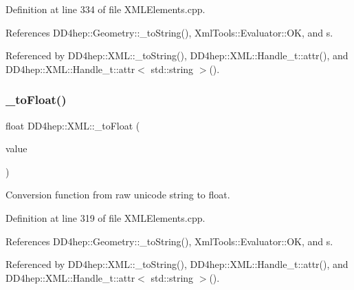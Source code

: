 Definition at line 334 of file X\+M\+L\+Elements.\+cpp.



References D\+D4hep\+::\+Geometry\+::\+\_\+to\+String(), Xml\+Tools\+::\+Evaluator\+::\+OK, and s.



Referenced by D\+D4hep\+::\+X\+M\+L\+::\+\_\+to\+String(), D\+D4hep\+::\+X\+M\+L\+::\+Handle\+\_\+t\+::attr(), and D\+D4hep\+::\+X\+M\+L\+::\+Handle\+\_\+t\+::attr$<$ std\+::string $>$().

\hypertarget{group___d_d4_h_e_p___x_m_l_ga74d0ba6278b3baa645887da2151279ee}{}\label{group___d_d4_h_e_p___x_m_l_ga74d0ba6278b3baa645887da2151279ee} 
\subsubsection{\texorpdfstring{\+\_\+to\+Float()}{\_toFloat()}}
{\footnotesize\ttfamily float D\+D4hep\+::\+X\+M\+L\+::\+\_\+to\+Float (\begin{DoxyParamCaption}\item[{const \hyperlink{namespace_d_d4hep_1_1_x_m_l_a09e5d9cc86ed782f6826dfe0778c1815}{Xml\+Char} $\ast$}]{value }\end{DoxyParamCaption})}



Conversion function from raw unicode string to float. 



Definition at line 319 of file X\+M\+L\+Elements.\+cpp.



References D\+D4hep\+::\+Geometry\+::\+\_\+to\+String(), Xml\+Tools\+::\+Evaluator\+::\+OK, and s.



Referenced by D\+D4hep\+::\+X\+M\+L\+::\+\_\+to\+String(), D\+D4hep\+::\+X\+M\+L\+::\+Handle\+\_\+t\+::attr(), and D\+D4hep\+::\+X\+M\+L\+::\+Handle\+\_\+t\+::attr$<$ std\+::string $>$().

\hypertarget{group___d_d4_h_e_p___x_m_l_ga8b2fbc55c4631087c0c5e905327f04d0}{}\label{group___d_d4_h_e_p___x_m_l_ga8b2fbc55c4631087c0c5e905327f04d0} 
